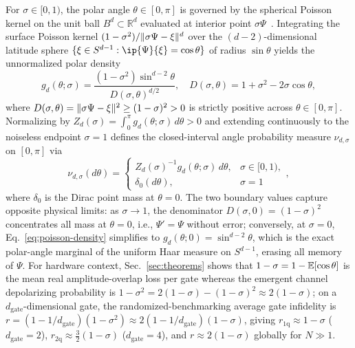 For $\sigma \in [0, 1)$, the polar angle $\theta \in [0, \pi]$ is governed by the spherical Poisson kernel on the unit ball $B^d \subset \mathbb{R}^d$ evaluated at interior point $\sigma\Psi$~\cite{LacallePozoCoronado2019,Axler2001}. Integrating the surface Poisson kernel $(1 - \sigma^2)/\lVert\sigma\Psi - \xi\rVert^d$ over the $(d - 2)$-dimensional latitude sphere $\{\xi \in S^{d-1} : \ip{\Psi}{\xi} = \cos\theta\}$ of radius $\sin\theta$ yields the unnormalized polar density
\begin{equation}
g_d(\theta; \sigma) = \frac{(1 - \sigma^2)\sin^{d-2}\theta}{D(\sigma, \theta)^{d/2}}, \quad D(\sigma, \theta) = 1 + \sigma^2 - 2\sigma\cos\theta,
\label{eq:poisson-density}
\end{equation}
where $D(\sigma, \theta) = \lVert\sigma\Psi - \xi\rVert^2 \ge (1 - \sigma)^2 > 0$ is strictly positive across $\theta \in [0, \pi]$. Normalizing by $Z_d(\sigma) = \int_0^\pi g_d(\theta; \sigma)\,d\theta > 0$ and extending continuously to the noiseless endpoint $\sigma = 1$ defines the closed-interval angle probability measure $\nu_{d,\sigma}$ on $[0, \pi]$ via
\begin{equation}
\nu_{d,\sigma}(d\theta) =
\begin{cases}
Z_d(\sigma)^{-1} g_d(\theta; \sigma)\,d\theta, & \sigma \in [0, 1), \\[3pt]
\delta_0(d\theta), & \sigma = 1
\end{cases},
\label{eq:poisson-measure}
\end{equation}
where $\delta_0$ is the Dirac point mass at $\theta = 0$. The two boundary values capture opposite physical limits: as $\sigma \to 1$, the denominator $D(\sigma, 0) = (1 - \sigma)^2$ concentrates all mass at $\theta = 0$, i.e., $\Psi' = \Psi$ without error; conversely, at $\sigma = 0$, Eq.~\eqref{eq:poisson-density} simplifies to $g_d(\theta; 0) = \sin^{d-2}\theta$, which is the exact polar-angle marginal of the uniform Haar measure on $S^{d-1}$, erasing all memory of $\Psi$. For hardware context, Sec.~\ref{sec:theorems} shows that $1 - \sigma = 1 - \mathbb{E}[\cos\theta]$ is the mean real amplitude-overlap loss per gate whereas the emergent channel depolarizing probability is $1 - \sigma^2 = 2(1 - \sigma) - (1 - \sigma)^2 \approx 2(1 - \sigma)$; on a $d_{\mathrm{gate}}$-dimensional gate, the randomized-benchmarking average gate infidelity is $r = (1 - 1/d_{\mathrm{gate}})(1 - \sigma^2) \approx 2(1 - 1/d_{\mathrm{gate}})(1 - \sigma)$, giving $r_{1\mathrm{q}} \approx 1 - \sigma$ ($d_{\mathrm{gate}} = 2$), $r_{2\mathrm{q}} \approx \tfrac{3}{2}(1 - \sigma)$ ($d_{\mathrm{gate}} = 4$), and $r \approx 2(1 - \sigma)$ globally for $N \gg 1$.

